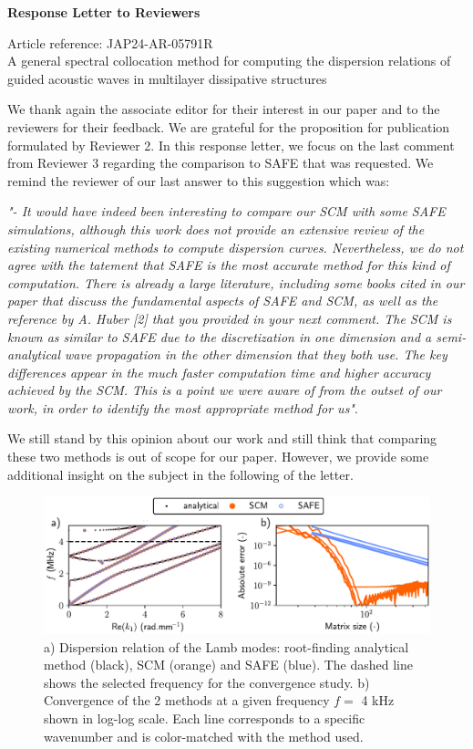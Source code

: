 \documentclass[11pt, a4paper]{article}
\begin{document}
\begin{center}
    \begin{Large}
        \textbf{Response Letter to Reviewers}\\[1em]
    \end{Large}
    Article reference: JAP24-AR-05791R \\ A general spectral collocation method for computing the dispersion relations of guided acoustic waves in multilayer dissipative structures
\end{center}

\vspace*{1cm}

We thank again the associate editor for their interest in our paper and to the reviewers for their feedback. We are grateful for the proposition for publication formulated by Reviewer 2. In this response letter, we focus on the last comment from Reviewer 3 regarding the comparison to SAFE that was requested. We remind the reviewer of our last answer to this suggestion which was:

\emph{"- It would have indeed been interesting to compare our SCM with some SAFE simulations, although this work does not provide an extensive review of the existing numerical methods to compute
dispersion curves. Nevertheless, we do not agree with the  tatement that SAFE is the most accurate method for this kind of computation. There is already a large literature, including some books cited in our paper that discuss the fundamental aspects of SAFE and SCM, as well as the reference by A. Huber [2] that you provided in your next comment. The SCM is known as similar to SAFE due to the discretization in one dimension and a semi-analytical wave propagation in the other dimension that they both use. The key differences appear in the much faster computation time and higher accuracy achieved by the SCM. This is a point we were aware of from the outset of our work, in
order to identify the most appropriate method for us"}. 

We still stand by this opinion about our work and still think that comparing these two methods is out of scope for our paper. However, we provide some additional insight on the subject in the following of the letter.

\begin{figure}[h!]
    \includegraphics{figure.pdf}
    \caption{a) Dispersion relation of the Lamb modes: root-finding analytical method (black), SCM (orange) and SAFE (blue). The dashed line shows the selected frequency for the convergence study. b) Convergence of the 2 methods at a given frequency $f=$ 4 kHz shown in log-log scale. Each line corresponds to a specific wavenumber and is color-matched with the method used.}
    \label{fig:figure}
\end{figure}
\end{document}
